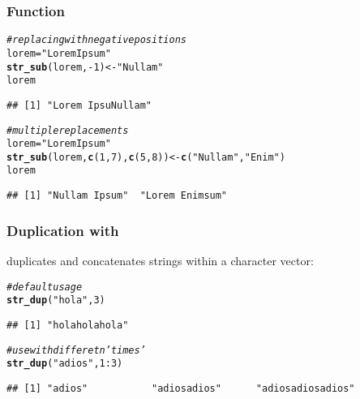 \documentclass[12pt]{beamer}\usepackage[]{graphicx}\usepackage[]{color}
\makeatletter
\newcommand{\hlnum}[1]{\textcolor[rgb]{0.686,0.059,0.569}{#1}}%
\newcommand{\hlstr}[1]{\textcolor[rgb]{0.192,0.494,0.8}{#1}}%
\newcommand{\hlcom}[1]{\textcolor[rgb]{0.678,0.584,0.686}{\textit{#1}}}%
\newcommand{\hlopt}[1]{\textcolor[rgb]{0,0,0}{#1}}%
\newcommand{\hlstd}[1]{\textcolor[rgb]{0.345,0.345,0.345}{#1}}%
\newcommand{\hlkwb}[1]{\textcolor[rgb]{0.69,0.353,0.396}{#1}}%
\newcommand{\hlkwd}[1]{\textcolor[rgb]{0.737,0.353,0.396}{\textbf{#1}}}%
\newenvironment{kframe}{%
 \def\at@end@of@kframe{}%
 \ifinner\ifhmode%
  \def\at@end@of@kframe{\end{minipage}}%
  \begin{minipage}{\columnwidth}%
 \fi\fi%
 \def\FrameCommand##1{\hskip\@totalleftmargin \hskip-\fboxsep
 \colorbox{shadecolor}{##1}\hskip-\fboxsep
     \hskip-\linewidth \hskip-\@totalleftmargin \hskip\columnwidth}%
 \MakeFramed {\advance\hsize-\width
   \@totalleftmargin\z@ \linewidth\hsize
   \@setminipage}}%
 {\par\unskip\endMakeFramed%
 \at@end@of@kframe}
\newenvironment{knitrout}{}{} %
\makeatother
\begin{document}
\begin{frame}[fragile]
\frametitle{Function }

\begin{knitrout}\footnotesize
{}\color{fgcolor}\begin{kframe}
\begin{alltt}
\hlcom{# replacing with negative positions}
\hlstd{lorem} \hlkwb{=} \hlstr{"Lorem Ipsum"}
\hlkwd{str_sub}\hlstd{(lorem,} \hlopt{-}\hlnum{1}\hlstd{)} \hlkwb{<-} \hlstr{"Nullam"}
\hlstd{lorem}
\end{alltt}
\begin{verbatim}
## [1] "Lorem IpsuNullam"
\end{verbatim}
\begin{alltt}
\hlcom{# multiple replacements }
\hlstd{lorem} \hlkwb{=} \hlstr{"Lorem Ipsum"}
\hlkwd{str_sub}\hlstd{(lorem,} \hlkwd{c}\hlstd{(}\hlnum{1}\hlstd{,}\hlnum{7}\hlstd{),} \hlkwd{c}\hlstd{(}\hlnum{5}\hlstd{,}\hlnum{8}\hlstd{))} \hlkwb{<-} \hlkwd{c}\hlstd{(}\hlstr{"Nullam"}\hlstd{,} \hlstr{"Enim"}\hlstd{)}
\hlstd{lorem}
\end{alltt}
\begin{verbatim}
## [1] "Nullam Ipsum"  "Lorem Enimsum"
\end{verbatim}
\end{kframe}
\end{knitrout}

\end{frame}


\begin{frame}[fragile]
\frametitle{Duplication with }

 duplicates and concatenates strings within a character vector:
\begin{knitrout}\footnotesize
{}\color{fgcolor}\begin{kframe}
\begin{alltt}
\hlcom{# default usage}
\hlkwd{str_dup}\hlstd{(}\hlstr{"hola"}\hlstd{,} \hlnum{3}\hlstd{)}
\end{alltt}
\begin{verbatim}
## [1] "holaholahola"
\end{verbatim}
\begin{alltt}
\hlcom{# use with differetn 'times'}
\hlkwd{str_dup}\hlstd{(}\hlstr{"adios"}\hlstd{,} \hlnum{1}\hlopt{:}\hlnum{3}\hlstd{)}
\end{alltt}
\begin{verbatim}
## [1] "adios"           "adiosadios"      "adiosadiosadios"
\end{verbatim}
\end{kframe}
\end{knitrout}

\end{frame}
\end{document}
